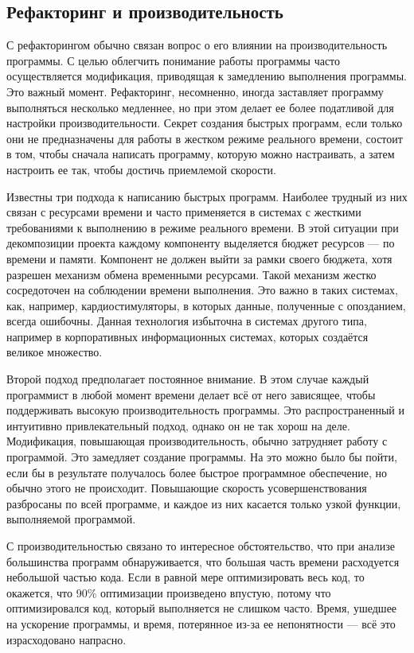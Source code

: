 \documentclass{../../text-style}
\begin{document}
\subsection{Рефакторинг и производительность}

С рефакторингом обычно связан вопрос о его влиянии на производительность программы. С целью облегчить понимание работы программы часто осуществляется модификация, приводящая к замедлению выполнения программы. Это важный момент. Рефакторинг, несомненно, иногда заставляет программу выполняться несколько медленнее, но при этом делает ее более податливой для настройки производительности. Секрет создания быстрых программ, если только они не предназначены для работы в жестком режиме реального времени, состоит в том, чтобы сначала написать программу, которую можно настраивать, а затем настроить ее так, чтобы достичь приемлемой скорости.

Известны три подхода к написанию быстрых программ. Наиболее трудный из них связан с ресурсами времени и часто применяется в системах с жесткими требованиями к выполнению в режиме реального времени. В этой ситуации при декомпозиции проекта каждому компоненту выделяется бюджет ресурсов --- по времени и памяти. Компонент не должен выйти за рамки своего бюджета, хотя разрешен механизм обмена временными ресурсами. Такой механизм жестко сосредоточен на соблюдении времени выполнения. Это важно в таких системах, как, например, кардиостимуляторы, в которых данные, полученные с опозданием, всегда ошибочны. Данная технология избыточна в системах другого типа, например в корпоративных информационных системах, которых создаётся великое множество.

Второй подход предполагает постоянное внимание. В этом случае каждый программист в любой момент времени делает всё от него зависящее, чтобы поддерживать высокую производительность программы. Это распространенный и интуитивно привлекательный подход, однако он не так хорош на деле. Модификация, повышающая производительность, обычно затрудняет работу с программой. Это замедляет создание программы. На это можно было бы пойти, если бы в результате получалось более быстрое программное обеспечение, но обычно этого не происходит. Повышающие скорость усовершенствования разбросаны по всей программе, и каждое из них касается только узкой функции, выполняемой программой.

С производительностью связано то интересное обстоятельство, что при анализе большинства программ обнаруживается, что большая часть времени расходуется небольшой частью кода. Если в равной мере оптимизировать весь код, то окажется, что 90\% оптимизации произведено впустую, потому что оптимизировался код, который выполняется не слишком часто. Время, ушедшее на ускорение программы, и время, потерянное из-за ее непонятности --- всё это израсходовано напрасно.
\end{document}
